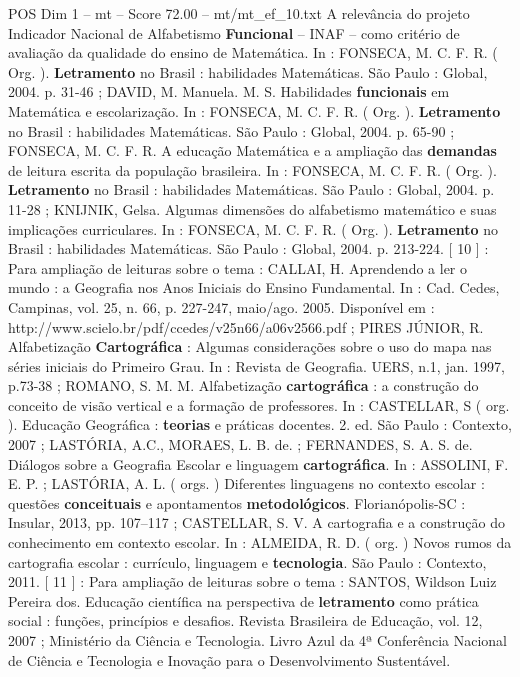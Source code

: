 \begin{textsample}{POS Dim 1 – mt – Score 72.00 – mt/mt\_ef\_10.txt}
A relevância do projeto Indicador Nacional de Alfabetismo \textbf{Funcional} – INAF – como critério de avaliação da qualidade do ensino de Matemática.
In : FONSECA, M.
C.
F.
R. ( Org. ). \textbf{Letramento} no Brasil : habilidades Matemáticas.
São Paulo : Global, 2004. p. 31-46 ; DAVID, M.
Manuela.
M.
S.
Habilidades \textbf{funcionais} em Matemática e escolarização.
In : FONSECA, M.
C.
F.
R. ( Org. ). \textbf{Letramento} no Brasil : habilidades Matemáticas.
São Paulo : Global, 2004. p. 65-90 ; FONSECA, M.
C.
F.
R.
A educação Matemática e a ampliação das \textbf{demandas} de leitura escrita da população brasileira.
In : FONSECA, M.
C.
F.
R. ( Org. ). \textbf{Letramento} no Brasil : habilidades Matemáticas.
São Paulo : Global, 2004. p. 11-28 ; KNIJNIK, Gelsa.
Algumas dimensões do alfabetismo matemático e suas implicações curriculares.
In : FONSECA, M.
C.
F.
R. ( Org. ). \textbf{Letramento} no Brasil : habilidades Matemáticas.
São Paulo : Global, 2004. p. 213-224. [ 10 ] : Para ampliação de leituras sobre o tema : CALLAI, H.
Aprendendo a ler o mundo : a Geografia nos Anos Iniciais do Ensino Fundamental.
In : Cad.
Cedes, Campinas, vol. 25, n. 66, p. 227-247, maio/ago. 2005.
Disponível em : http://www.scielo.br/pdf/ccedes/v25n66/a06v2566.pdf ; PIRES JÚNIOR, R.
Alfabetização \textbf{Cartográfica} : Algumas considerações sobre o uso do mapa nas séries iniciais do Primeiro Grau.
In : Revista de Geografia.
UERS, n.1, jan. 1997, p.73-38 ; ROMANO, S.
M.
M.
Alfabetização \textbf{cartográfica} : a construção do conceito de visão vertical e a formação de professores.
In : CASTELLAR, S ( org. ).
Educação Geográfica : \textbf{teorias} e práticas docentes. 2. ed.
São Paulo : Contexto, 2007 ; LASTÓRIA, A.C., MORAES, L.
B. de. ; FERNANDES, S.
A.
S. de.
Diálogos sobre a Geografia Escolar e linguagem \textbf{cartográfica}.
In : ASSOLINI, F.
E.
P. ; LASTÓRIA, A.
L. ( orgs. ) Diferentes linguagens no contexto escolar : questões \textbf{conceituais} e apontamentos \textbf{metodológicos}.
Florianópolis-SC : Insular, 2013, pp. 107–117 ; CASTELLAR, S.
V.
A cartografia e a construção do conhecimento em contexto escolar.
In : ALMEIDA, R.
D. ( org. ) Novos rumos da cartografia escolar : currículo, linguagem e \textbf{tecnologia}.
São Paulo : Contexto, 2011. [ 11 ] : Para ampliação de leituras sobre o tema : SANTOS, Wildson Luiz Pereira dos.
Educação científica na perspectiva de \textbf{letramento} como prática social : funções, princípios e desafios.
Revista Brasileira de Educação, vol. 12, 2007 ; Ministério da Ciência e Tecnologia.
Livro Azul da 4ª Conferência Nacional de Ciência e Tecnologia e Inovação para o Desenvolvimento Sustentável.

\end{textsample}
